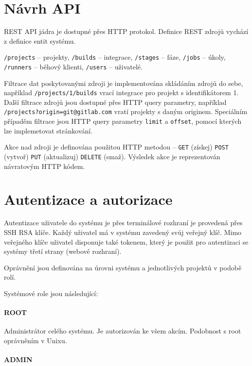 \section{Návrh API}

REST API jádra je dostupné přes HTTP protokol.
Definice REST zdrojů vychází z definice entit systému.

\verb|/projects| -- projekty,
\verb|/builds| -- integrace,
\verb|/stages| -- fáze,
\verb|/jobs| -- úkoly,
\verb|/runners| -- běhový klienti,
\verb|/users| -- uživatelé.

Filtrace dat poskytovanými zdroji je implementována skládáním zdrojů do sebe, například \verb|/projects/1/builds| vrací integrace pro projekt s identifikátorem 1.
Další filtrace zdrojů jsou dostupné přes HTTP query parametry, například \verb|/projects?origin=git@gitlab.com| vratí projekty s daným originem.
Speciálním případěm filtrace jsou HTTP query parametry \verb|limit| a \verb|offset|, pomocí kterých lze implemetovat stránkování.

Akce nad zdroji je definována použitou HTTP metodou -- \verb|GET| (získej) \verb|POST| (vytvoř) \verb|PUT| (aktualizuj) \verb|DELETE| (smaž).
Výsledek akce je reprezentován návratovým HTTP kódem.

\section{Autentizace a autorizace}

Autentizace uživatele do systému je přes terminálové rozhraní je provedená přes SSH RSA klíče.
Každý uživatel má v systému zavedený svůj veřejný klíč.
Mimo veřejného klíče uživatel disponuje také tokenem, který je použit pro autentizaci se systémy třetí strany (webové rozhraní).

Oprávnění jsou definována na úrovni systému a jednotlivých projektů v podobě rolí.

\noindent\makebox[\linewidth]{\rule{\textwidth}{0.4pt}}

Systémové role jsou následující:

\paragraph{ROOT}

Administrátor celého systému.
Je autorizován ke všem akcím.
Podobnost s root oprávněním v Unixu.

\paragraph{ADMIN}

